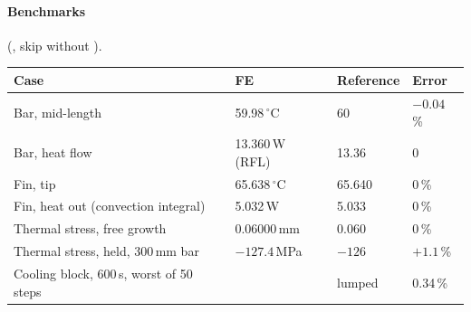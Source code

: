 \paragraph{Benchmarks} (, skip without ).
\begin{center}
\small
\begin{tabular}{@{}llll@{}}
\toprule
Case & FE & Reference & Error\\
\midrule
Bar, mid-length & 59.98\,$^\circ$C & 60 & $-0.04$\,\%\\
Bar, heat flow & 13.360\,W (RFL) & 13.36 & 0\\
Fin, tip & 65.638\,$^\circ$C & 65.640 & 0\,\%\\
Fin, heat out (convection integral) & 5.032\,W & 5.033 & 0\,\%\\
Thermal stress, free growth & 0.06000\,mm & 0.060 & 0\,\%\\
Thermal stress, held, 300\,mm bar & $-127.4$\,MPa & $-126$ & $+1.1$\,\%\\
Cooling block, 600\,s, worst of 50 steps & & lumped & 0.34\,\%\\
\bottomrule
\end{tabular}
\end{center}

